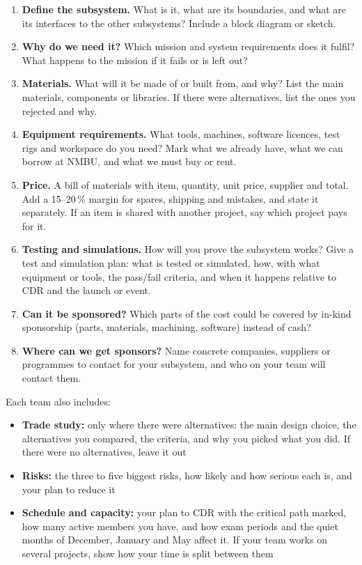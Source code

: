 \documentclass{../../Common/Latex/Templates/rapport}
\begin{document}
\begin{enumerate}
  \item \textbf{Define the subsystem.} What is it, what are its boundaries, and what are its interfaces to the other subsystems? Include a block diagram or sketch.
  \item \textbf{Why do we need it?} Which mission and system requirements does it fulfil? What happens to the mission if it fails or is left out?
  \item \textbf{Materials.} What will it be made of or built from, and why? List the main materials, components or libraries. If there were alternatives, list the ones you rejected and why.
  \item \textbf{Equipment requirements.} What tools, machines, software licences, test rigs and workspace do you need? Mark what we already have, what we can borrow at NMBU, and what we must buy or rent.
  \item \textbf{Price.} A bill of materials with item, quantity, unit price, supplier and total. Add a 15--20\,\% margin for spares, shipping and mistakes, and state it separately. If an item is shared with another project, say which project pays for it.
  \item \textbf{Testing and simulations.} How will you prove the subsystem works? Give a test and simulation plan: what is tested or simulated, how, with what equipment or tools, the pass/fail criteria, and when it happens relative to CDR and the launch or event.
  \item \textbf{Can it be sponsored?} Which parts of the cost could be covered by in-kind sponsorship (parts, materials, machining, software) instead of cash?
  \item \textbf{Where can we get sponsors?} Name concrete companies, suppliers or programmes to contact for your subsystem, and who on your team will contact them.
\end{enumerate}

Each team also includes:
\begin{itemize}
  \item \textbf{Trade study:} only where there were alternatives: the main design choice, the alternatives you compared, the criteria, and why you picked what you did. If there were no alternatives, leave it out
  \item \textbf{Risks:} the three to five biggest risks, how likely and how serious each is, and your plan to reduce it
  \item \textbf{Schedule and capacity:} your plan to CDR with the critical path marked, how many active members you have, and how exam periods and the quiet months of December, January and May affect it. If your team works on several projects, show how your time is split between them
\end{itemize}
\end{document}

